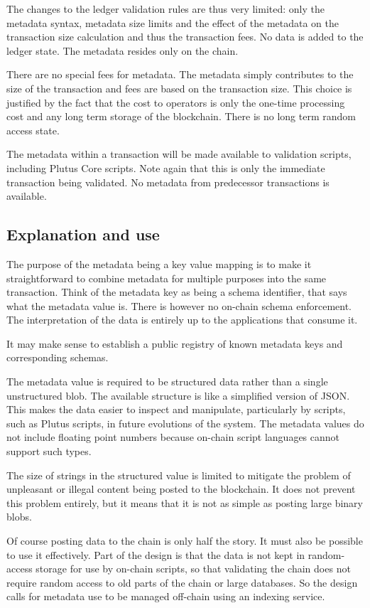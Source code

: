 \documentclass[11pt,a4paper,dvipsnames,twosided]{article}
\begin{document}
The changes to the ledger validation rules are thus very limited: only the
metadata syntax, metadata size limits and the effect of the metadata on the
transaction size calculation and thus the transaction fees. No data is added
to the ledger state. The metadata resides only on the chain.

There are no special fees for metadata. The metadata simply contributes to the
size of the transaction and fees are based on the transaction size. This choice
is justified by the fact that the cost to operators is only the one-time
processing cost and any long term storage of the blockchain. There is no long
term random access state.

The metadata within a transaction will be made available to validation scripts,
including Plutus Core scripts. Note again that this is only the immediate
transaction being validated. No metadata from predecessor transactions is
available.

\subsection{Explanation and use}

The purpose of the metadata being a key value mapping is to make it
straightforward to combine metadata for multiple purposes into the same
transaction. Think of the metadata key as being a schema identifier, that
says what the metadata value is. There is however no on-chain schema
enforcement. The interpretation of the data is entirely up to the applications
that consume it.

It may make sense to establish a public registry of known metadata keys and
corresponding schemas.

The metadata value is required to be structured data rather than a single
unstructured blob. The available structure is like a simplified version of JSON.
This makes the data easier to inspect and manipulate, particularly by scripts,
such as Plutus scripts, in future evolutions of the system. The metadata values
do not include floating point numbers because on-chain script languages cannot
support such types.

The size of strings in the structured value is limited to mitigate the problem
of unpleasant or illegal content being posted to the blockchain. It does not
prevent this problem entirely, but it means that it is not as simple as posting
large binary blobs.

Of course posting data to the chain is only half the story. It must also be
possible to use it effectively. Part of the design is that the data is not
kept in random-access storage for use by on-chain scripts, so that validating
the chain does not require random access to old parts of the chain or large
databases. So the design calls for metadata use to be managed off-chain using
an indexing service.
\end{document}
